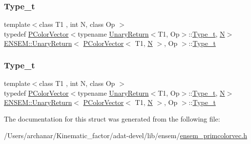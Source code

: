 \subsubsection{\texorpdfstring{Type\_t}{Type\_t}\hspace{0.1cm}{\footnotesize\ttfamily [2/3]}}
{\footnotesize\ttfamily template$<$class T1 , int N, class Op $>$ \\
typedef \mbox{\hyperlink{classENSEM_1_1PColorVector}{P\+Color\+Vector}}$<$typename \mbox{\hyperlink{structENSEM_1_1UnaryReturn}{Unary\+Return}}$<$T1, Op$>$\+::\mbox{\hyperlink{structENSEM_1_1UnaryReturn_3_01PColorVector_3_01T1_00_01N_01_4_00_01Op_01_4_a6f37cb5e1ae5f22c02017b613c6b7e24}{Type\+\_\+t}}, \mbox{\hyperlink{adat__devel_2lib_2hadron_2operator__name__util_8cc_a7722c8ecbb62d99aee7ce68b1752f337}{N}}$>$ \mbox{\hyperlink{structENSEM_1_1UnaryReturn}{E\+N\+S\+E\+M\+::\+Unary\+Return}}$<$ \mbox{\hyperlink{classENSEM_1_1PColorVector}{P\+Color\+Vector}}$<$ T1, \mbox{\hyperlink{adat__devel_2lib_2hadron_2operator__name__util_8cc_a7722c8ecbb62d99aee7ce68b1752f337}{N}} $>$, Op $>$\+::\mbox{\hyperlink{structENSEM_1_1UnaryReturn_3_01PColorVector_3_01T1_00_01N_01_4_00_01Op_01_4_a6f37cb5e1ae5f22c02017b613c6b7e24}{Type\+\_\+t}}}

\mbox{\label{structENSEM_1_1UnaryReturn_3_01PColorVector_3_01T1_00_01N_01_4_00_01Op_01_4_a6f37cb5e1ae5f22c02017b613c6b7e24}} 
\subsubsection{\texorpdfstring{Type\_t}{Type\_t}\hspace{0.1cm}{\footnotesize\ttfamily [3/3]}}
{\footnotesize\ttfamily template$<$class T1 , int N, class Op $>$ \\
typedef \mbox{\hyperlink{classENSEM_1_1PColorVector}{P\+Color\+Vector}}$<$typename \mbox{\hyperlink{structENSEM_1_1UnaryReturn}{Unary\+Return}}$<$T1, Op$>$\+::\mbox{\hyperlink{structENSEM_1_1UnaryReturn_3_01PColorVector_3_01T1_00_01N_01_4_00_01Op_01_4_a6f37cb5e1ae5f22c02017b613c6b7e24}{Type\+\_\+t}}, \mbox{\hyperlink{adat__devel_2lib_2hadron_2operator__name__util_8cc_a7722c8ecbb62d99aee7ce68b1752f337}{N}}$>$ \mbox{\hyperlink{structENSEM_1_1UnaryReturn}{E\+N\+S\+E\+M\+::\+Unary\+Return}}$<$ \mbox{\hyperlink{classENSEM_1_1PColorVector}{P\+Color\+Vector}}$<$ T1, \mbox{\hyperlink{adat__devel_2lib_2hadron_2operator__name__util_8cc_a7722c8ecbb62d99aee7ce68b1752f337}{N}} $>$, Op $>$\+::\mbox{\hyperlink{structENSEM_1_1UnaryReturn_3_01PColorVector_3_01T1_00_01N_01_4_00_01Op_01_4_a6f37cb5e1ae5f22c02017b613c6b7e24}{Type\+\_\+t}}}



The documentation for this struct was generated from the following file\+:\begin{DoxyCompactItemize}
\item 
/\+Users/archanar/\+Kinematic\+\_\+factor/adat-\/devel/lib/ensem/\mbox{\hyperlink{adat-devel_2lib_2ensem_2ensem__primcolorvec_8h}{ensem\+\_\+primcolorvec.\+h}}\end{DoxyCompactItemize}
